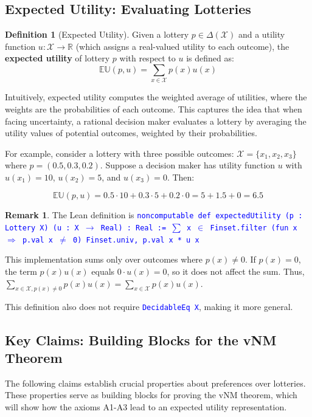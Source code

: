 \documentclass{article}
\theoremstyle{definition}
\newtheorem{definition}{Definition}[section]
\newtheorem{remark}{Remark}[section]
\newcommand{\R}{\mathbb{R}}
\newcommand{\X}{\mathcal{X}}
\newcommand{\EU}{\mathbb{EU}}
\newcommand{\tactic}[1]{\textcolor{blue}{\texttt{#1}}}
\newcommand{\DeltaX}{\Delta(\X)} %
\begin{document}
\subsection{Expected Utility: Evaluating Lotteries}

\begin{definition}[Expected Utility]\label{def:expected_utility}
Given a lottery $p \in \DeltaX$ and a utility function $u: \X \to \R$ (which assigns a real-valued utility to each outcome), the \textbf{expected utility} of lottery $p$ with respect to $u$ is defined as:
\[ \EU(p, u) = \sum_{x \in \X} p(x)u(x) \]
\end{definition}

Intuitively, expected utility computes the weighted average of utilities, where the weights are the probabilities of each outcome. This captures the idea that when facing uncertainty, a rational decision maker evaluates a lottery by averaging the utility values of potential outcomes, weighted by their probabilities.

For example, consider a lottery with three possible outcomes: $\X = \{x_1, x_2, x_3\}$ where $p = (0.5, 0.3, 0.2)$. Suppose a decision maker has utility function $u$ with $u(x_1) = 10$, $u(x_2) = 5$, and $u(x_3) = 0$. Then:

\[\EU(p, u) = 0.5 \cdot 10 + 0.3 \cdot 5 + 0.2 \cdot 0 = 5 + 1.5 + 0 = 6.5\]

\begin{remark}
The Lean definition is \tactic{noncomputable def expectedUtility (p : Lottery X) (u : X $\rightarrow$ Real) : Real := $\sum$ x $\in$ Finset.filter (fun x $\Rightarrow$ p.val x $\neq$ 0) Finset.univ, p.val x * u x}

This implementation sums only over outcomes where $p(x) \neq 0$. If $p(x) = 0$, the term $p(x)u(x)$ equals $0 \cdot u(x) = 0$, so it does not affect the sum. Thus, $\sum_{x \in \X, p(x) \ne 0} p(x)u(x) = \sum_{x \in \X} p(x)u(x)$.

This definition also does not require \tactic{DecidableEq X}, making it more general.
\end{remark}

\subsection{Key Claims: Building Blocks for the vNM Theorem}

The following claims establish crucial properties about preferences over lotteries. These properties serve as building blocks for proving the vNM theorem, which will show how the axioms A1-A3 lead to an expected utility representation.
\end{document}
